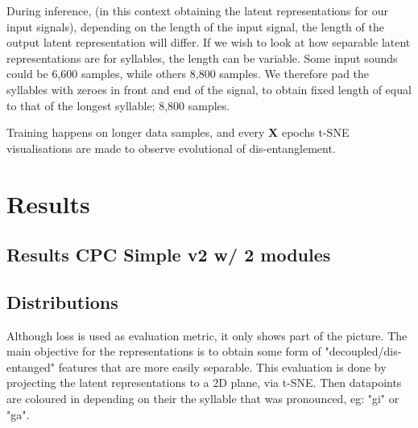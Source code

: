 		During inference, (in this context obtaining the latent representations for our input signals), depending on the length of the input signal, the length of the output latent representation will differ.
		If we wish to look at how separable latent representations are for syllables, the length can be variable. Some input sounds could be 6,600 samples, while others 8,800 samples. We therefore pad the syllables with zeroes in front and end of the signal, to obtain fixed length of equal to that of the longest syllable; 8,800 samples.
		
		Training happens on longer data samples, and every \textbf{X} epochs t-SNE visualisations are made to observe evolutional of dis-entanglement.
		

\section{Results}

	\subsection{Results CPC Simple v2 w/ 2 modules}
	
	\subsection{Distributions}
	
		Although loss is used as evaluation metric, it only shows part of the picture. The main objective for the representations is to obtain some form of "decoupled/dis-entanged" features that are more easily separable. This evaluation is done by projecting the latent representations to a 2D plane, via t-SNE. Then datapoints are coloured in depending on their the syllable that was pronounced, eg: "gi" or "ga".
		
		
		

	
